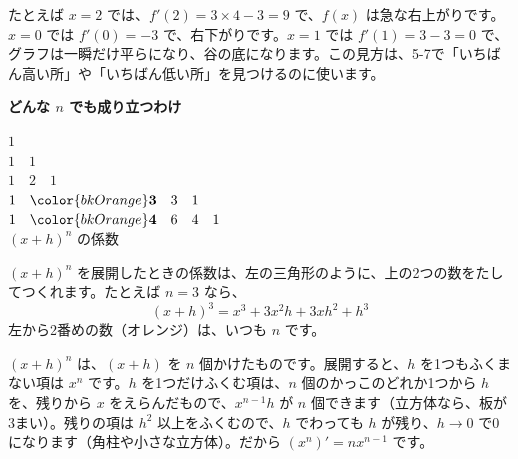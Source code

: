\vspace{2pt}
たとえば $x=2$ では、$f'(2)=3\times4-3=9$ で、$f(x)$ は急な右上がりです。$x=0$ では $f'(0)=-3$ で、右下がりです。$x=1$ では $f'(1)=3-3=0$ で、グラフは一瞬だけ平らになり、谷の底になります。この見方は、5-7で「いちばん高い所」や「いちばん低い所」を見つけるのに使います。



\begin{motto}[3]
\textbf{どんな $n$ でも成り立つわけ}\par\vspace{4pt}
\noindent\begin{minipage}[c]{0.3\linewidth}\centering\small
$1$\\ $1\quad1$\\ $1\quad2\quad1$\\ $1\quad{\color{bkOrange}\mathbf{3}}\quad3\quad1$\\ $1\quad{\color{bkOrange}\mathbf{4}}\quad6\quad4\quad1$\\[2pt]
{\footnotesize $(x+h)^n$ の係数}
\end{minipage}\hfill
\begin{minipage}[c]{22\zw}
$(x+h)^n$ を展開したときの係数は、左の三角形のように、上の2つの数をたしてつくれます。たとえば $n=3$ なら、
\[ (x+h)^3=x^3+3x^2h+3xh^2+h^3 \]
左から2番めの数（オレンジ）は、いつも $n$ です。
\end{minipage}\par\vspace{3pt}
$(x+h)^n$ は、$(x+h)$ を $n$ 個かけたものです。展開すると、$h$ を1つもふくまない項は $x^n$ です。$h$ を1つだけふくむ項は、$n$ 個のかっこのどれか1つから $h$ を、残りから $x$ をえらんだもので、$x^{n-1}h$ が $n$ 個できます（立方体なら、板が3まい）。残りの項は $h^2$ 以上をふくむので、$h$ でわっても $h$ が残り、$h\to0$ で0になります（角柱や小さな立方体）。だから $(x^n)'=nx^{n-1}$ です。
\end{motto}

\begin{kotoba}
\small
{}
\end{kotoba}


